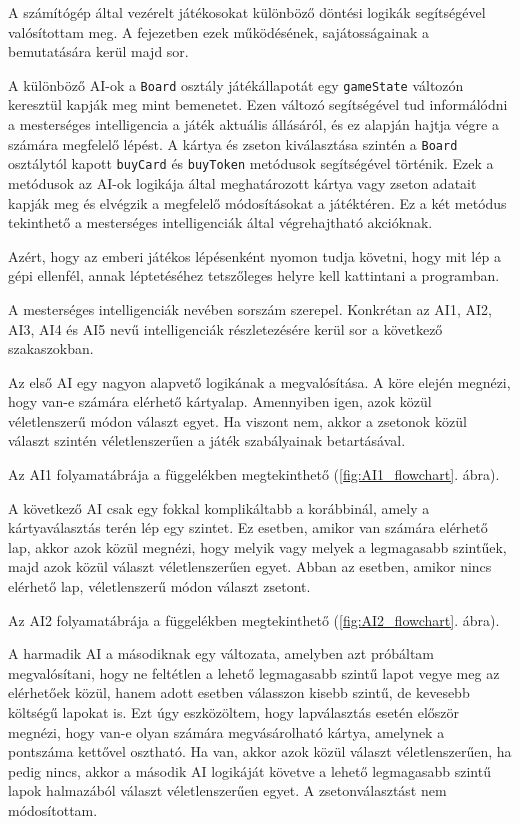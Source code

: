 
A számítógép által vezérelt játékosokat különböző döntési logikák segítségével valósítottam meg. A fejezetben ezek működésének, sajátosságainak a bemutatására kerül majd sor.

A különböző AI-ok a \texttt{Board} osztály játékállapotát egy \texttt{gameState} változón keresztül kapják meg mint bemenetet. Ezen változó segítségével tud informálódni a mesterséges intelligencia a játék aktuális állásáról, és ez alapján hajtja végre a számára megfelelő lépést. A kártya és zseton kiválasztása szintén a \texttt{Board} osztálytól kapott \texttt{buyCard} és \texttt{buyToken} metódusok segítségével történik. Ezek a metódusok az AI-ok logikája által meghatározott kártya vagy zseton adatait kapják meg és elvégzik a megfelelő módosításokat a játéktéren. Ez a két metódus tekinthető a mesterséges intelligenciák által végrehajtható akcióknak.

Azért, hogy az emberi játékos lépésenként nyomon tudja követni, hogy mit lép a gépi ellenfél, annak léptetéséhez tetszőleges helyre kell kattintani a programban.

A mesterséges intelligenciák nevében sorszám szerepel. Konkrétan az AI1, AI2, AI3, AI4 és AI5 nevű intelligenciák részletezésére kerül sor a következő szakaszokban.


Az első AI egy nagyon alapvető logikának a megvalósítása. A köre elején megnézi, hogy van-e számára elérhető kártyalap. Amennyiben igen, azok közül véletlenszerű módon választ egyet. Ha viszont nem, akkor a zsetonok közül választ szintén véletlenszerűen a játék szabályainak betartásával.

Az AI1 folyamatábrája a függelékben megtekinthető (\ref{fig:AI1_flowchart}. ábra).



A következő AI csak egy fokkal komplikáltabb a korábbinál, amely a kártyaválasztás terén lép egy szintet. Ez esetben, amikor van számára elérhető lap, akkor azok közül megnézi, hogy melyik vagy melyek a legmagasabb szintűek, majd azok közül választ véletlenszerűen egyet. Abban az esetben, amikor nincs elérhető lap, véletlenszerű módon választ zsetont.

Az AI2 folyamatábrája a függelékben megtekinthető (\ref{fig:AI2_flowchart}. ábra).



A harmadik AI a másodiknak egy változata, amelyben azt próbáltam megvalósítani, hogy ne feltétlen a lehető legmagasabb szintű lapot vegye meg az elérhetőek közül, hanem adott esetben válasszon kisebb szintű, de kevesebb költségű lapokat is. Ezt úgy eszközöltem, hogy lapválasztás esetén először megnézi, hogy van-e olyan számára megvásárolható kártya, amelynek a pontszáma kettővel osztható. Ha van, akkor azok közül választ véletlenszerűen, ha pedig nincs, akkor a második AI logikáját követve a lehető legmagasabb szintű lapok halmazából választ véletlenszerűen egyet. A zsetonválasztást nem módosítottam.

